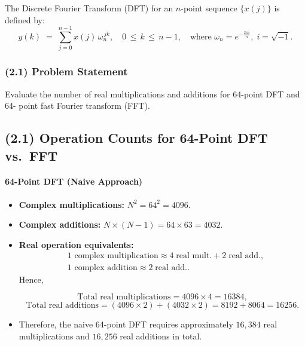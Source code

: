 \documentclass[11pt]{article}
\begin{document}
The Discrete Fourier Transform (DFT) for an \(n\)-point sequence \(\{x(j)\}\) is defined by:
\[
y(k) \;=\; \sum_{j=0}^{n-1} x(j)\,\omega_n^{\,jk},
\quad
0 \,\le\, k \,\le\, n-1,
\quad
\text{where }
\omega_n = e^{-\tfrac{2\pi i}{n}},\; i=\sqrt{-1}.
\]

\subsubsection*{(2.1) Problem Statement}

Evaluate the number of real multiplications and additions for 64-point DFT and 64-
point fast Fourier transform (FFT).

\subsection*{(2.1) Operation Counts for 64-Point DFT vs.\ FFT}

\paragraph{64-Point DFT (Naive Approach)}
\begin{itemize}
\item \textbf{Complex multiplications:} \(N^2 = 64^2 = 4096\).
\item \textbf{Complex additions:} \(N \times (N-1) = 64 \times 63 = 4032\).
\item \textbf{Real operation equivalents:}
\[
\begin{aligned}
&\text{1 complex multiplication} \approx 4\;\text{real mult.} + 2\;\text{real add.},\\
&\text{1 complex addition} \approx 2\;\text{real add.}.
\end{aligned}
\]
Hence,

\[
\text{Total real multiplications} = 4096 \times 4 = 16384,
\]
\[
\text{Total real additions} = (4096 \times 2) + (4032 \times 2) = 8192 + 8064 = 16256.
\]

\item Therefore, the naive 64-point DFT requires approximately \(16{,}384\) real multiplications and \(16{,}256\) real additions in total.
\end{itemize}
\end{document}
